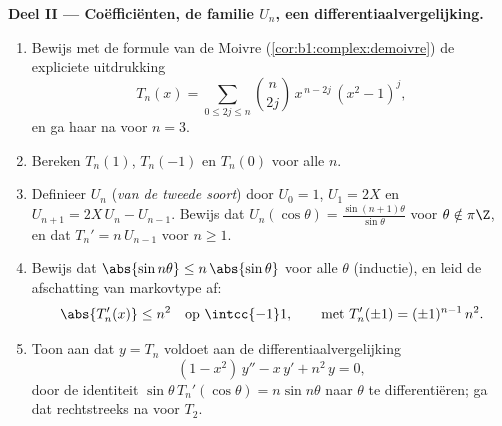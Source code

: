 \begin{problem}
\medskip
\noindent\textbf{Deel II --- Coëfficiënten, de familie $U_n$, een
differentiaalvergelijking.}
\begin{enumerate}[resume]
  \item Bewijs met de formule van de Moivre
        (\cref{cor:b1:complex:demoivre}) de expliciete uitdrukking
        \[
        T_n(x) = \sum_{0 \leq 2j \leq n} \binom{n}{2j}\,
        x^{\,n-2j}\,(x^2 - 1)^j ,
        \]
        en ga haar na voor $n = 3$.
  \item Bereken $T_n(1)$, $T_n(-1)$ en $T_n(0)$ voor alle $n$.
  \item Definieer $U_n$ (\emph{van de tweede soort}) door $U_0 = 1$,
        $U_1 = 2X$ en $U_{n+1} = 2X\,U_n - U_{n-1}$. Bewijs dat
        $U_n(\cos\theta) = \frac{\sin(n+1)\theta}{\sin\theta}$ voor
        $\theta \notin \pi\Z$, en dat $T_n' = n\,U_{n-1}$ voor $n \geq
        1$.
  \item Bewijs dat $\abs{\sin n\theta} \leq n\,\abs{\sin\theta}$ voor
        alle $\theta$ (inductie), en leid de afschatting van
        markovtype af:
        \[
        \abs{T_n'(x)} \leq n^2
        \quad\text{op } \intcc{-1}1,
        \qquad\text{met } T_n'(\pm1) = (\pm1)^{n-1}\,n^2 .
        \]
  \item Toon aan dat $y = T_n$ voldoet aan de differentiaalvergelijking
        \[
        (1 - x^2)\,y'' - x\,y' + n^2\,y = 0 ,
        \]
        door de identiteit $\sin\theta\, T_n'(\cos\theta) = n\sin
        n\theta$ naar $\theta$ te differentiëren; ga dat rechtstreeks na
        voor $T_2$.
\end{enumerate}


\end{problem}
